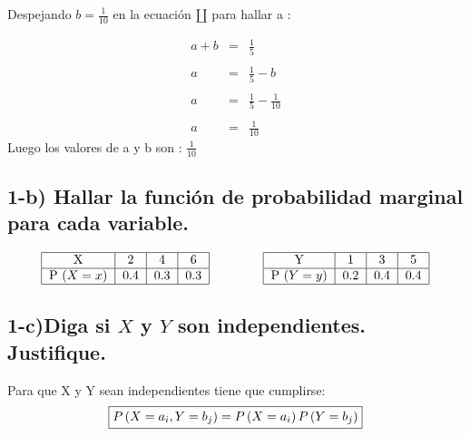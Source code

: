 \documentclass[12pt]{article}
\begin{document}
Despejando $b = \frac{1}{10}$ en la ecuaci\'on $\amalg$ para hallar a :


\begin{equation*}
    \begin{array}{rcccl}
        a  +  b & = & \frac{1}{5}
        \\
        \\
        a       & = & \frac{1}{5}  -  b
        \\
        \\
        a       & = & \frac{1}{5} - \frac{1}{10}
        \\
        \\
        a       & = & \frac{1}{10}
    \end{array}
\end{equation*}
Luego los valores de a y b son : $ \frac{1}{10}$


\subsection*{1-b) Hallar la funci\'on de probabilidad marginal para cada variable.}


\begin{equation*}
    \begin{tabular}{|c|c|c|c|}
        \hline
        X                    & 2   & 4   & 6
        \\\hline
        P $\left(X=x\right)$ & 0.4 & 0.3 & 0.3
        \\\hline
    \end{tabular}
    \hspace{1.5cm}
    \begin{tabular}{|c|c|c|c|}
        \hline
        Y                    & 1   & 3   & 5
        \\\hline
        P $\left(Y=y\right)$ & 0.2 & 0.4 & 0.4
        \\\hline
    \end{tabular}
\end{equation*}


\subsection*{1-c)Diga si $X$ y $Y$ son independientes. Justifique.}

\vspace*{0.5cm}

Para que X y Y sean independientes tiene que cumplirse:
\begin{equation*}
    \fbox{$
    P\left(X=a_i,Y=b_j\right) =  P\left(X=a_i\right) P\left(Y=b_j\right)
    $}
\end{equation*}
\end{document}
